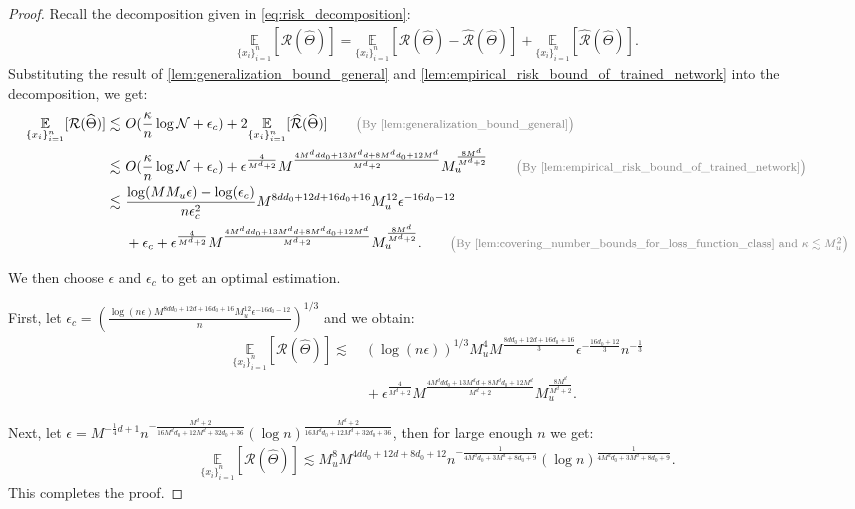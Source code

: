 \documentclass[12pt]{article}
\numberwithin{equation}{section}
\let\hat\widehat
\newcommand{\wh}{\widehat}
\renewcommand{\hat}{\wh}
\DeclareMathOperator*{\E}{{\mathbb{E}}}
\def\E{\mathbb{E}}
\theoremstyle{theoremstyle}
\numberwithin{equation}{section}
\numberwithin{theorem}{section}
\numberwithin{proposition}{section}
\numberwithin{definition}{section}
\numberwithin{lemma}{section}
\numberwithin{assumption}{section}
\numberwithin{remark}{section}
\newcommand*{\annot}[1]{\tag*{\footnotesize{\textcolor{black!50}{\big(#1\big)}}}}
\begin{document}
\begin{proof}
Recall the decomposition given in \eqref{eq:risk_decomposition}:
\begin{align*}
    \underset{\{x_i\}_{i=1}^n}{\E}[\mathcal{R}(\hat{\Theta})]=\underset{\{x_i\}_{i=1}^n}{\E}[\mathcal{R}(\hat{\Theta})-\hat{\mathcal{R}}(\hat{\Theta})]+ \underset{\{x_i\}_{i=1}^n}{\E}[\hat{\mathcal{R}}(\hat{\Theta})].
\end{align*}
Substituting the result of \cref{lem:generalization_bound_general} and \cref{lem:empirical_risk_bound_of_trained_network} into the decomposition, we get:
\begin{align*} 
    \underset{\{x_i\}_{i=1}^n}{\E}[\mathcal{R}(\hat{\Theta})]\lesssim & ~
    O(\frac{\kappa}{n}\log\mathcal{N}+\epsilon_c)+2\underset{\{x_i\}_{i=1}^n}{\E}[\hat{\mathcal{R}}(\hat{\Theta})] \annot{By \cref{lem:generalization_bound_general}} \\
    \lesssim & ~
    O(\frac{\kappa}{n}\log\mathcal{N}+\epsilon_c)+\epsilon^\frac{4}{M^d+2}M^{\frac{4M^ddd_0+13M^dd+8M^dd_0+12M^d}{M^d+2}}M_u^{\frac{8M^d}{M^d+2}} \annot{By \cref{lem:empirical_risk_bound_of_trained_network}}\\
    \lesssim & ~
    \frac{\log(MM_u\epsilon)-\log(\epsilon_c)}{n\epsilon_c^2}M^{8dd_0+12d+16d_0+16}M_u^{12}\epsilon^{-16d_0-12} \\
    & ~ +
    \epsilon_c+\epsilon^\frac{4}{M^d+2}M^{\frac{4M^ddd_0+13M^dd+8M^dd_0+12M^d}{M^d+2}}M_u^{\frac{8M^d}{M^d+2}}. \annot{By \cref{lem:covering_number_bounds_for_loss_function_class} and $\kappa\lesssim M_u^2$}
\end{align*}

We then choose $\epsilon$ and $\epsilon_c$ to get an optimal estimation.

First, let $\epsilon_c=(\frac{\log(n\epsilon)M^{8dd_0+12d+16d_0+16}M_u^{12}\epsilon^{-16d_0-12}}{n})^{1/3}$ and we obtain:
\begin{align*}
    \underset{\{x_i\}_{i=1}^n}{\E}[\mathcal{R}(\hat{\Theta})]\lesssim & ~
    (\log(n\epsilon))^{1/3}M_u^4M^{\frac{8dd_0+12d+16d_0+16}{3}}\epsilon^{-\frac{16d_0+12}{3}}n^{-\frac{1}{3}}\\
    & ~ +\epsilon^\frac{4}{M^d+2}M^{\frac{4M^ddd_0+13M^dd+8M^dd_0+12M^d}{M^d+2}}M_u^{\frac{8M^d}{M^d+2}}.
\end{align*}

Next, let $\epsilon=M^{-\frac{1}{4}d+1}n^{-\frac{M^d+2}{16M^dd_0+12M^d+32d_0+36}}(\log n)^{\frac{M^d+2}{16M^dd_0+12M^d+32d_0+36}}$, then for large enough $n$ we get:
\begin{align*}
    \underset{\{x_i\}_{i=1}^n}{\E}[\mathcal{R}(\hat{\Theta})] \lesssim M_u^8M^{4dd_0+12d+8d_0+12}n^{-\frac{ 1}{4M^dd_0+3M^d+8d_0+9}}(\log n)^{\frac{1}{4M^dd_0+3M^d+8d_0+9}}.
\end{align*}
This completes the proof.
\end{proof}
\end{document}
